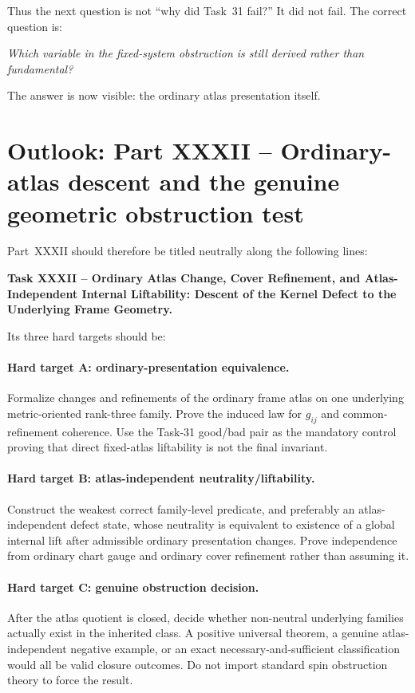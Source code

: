 \documentclass[11pt,a4paper]{article}
\theoremstyle{definition}
\begin{document}
Thus the next question is not ``why did Task~31 fail?''  It did not fail.  The correct question is:
\begin{center}
\emph{Which variable in the fixed-system obstruction is still derived rather than fundamental?}
\end{center}
The answer is now visible: the ordinary atlas presentation itself.

\section{Outlook: Part XXXII -- Ordinary-atlas descent and the genuine geometric obstruction test}\label{sec:outlook}

Part~XXXII should therefore be titled neutrally along the following lines:

\begin{center}
\textbf{Task XXXII -- Ordinary Atlas Change, Cover Refinement, and Atlas-Independent Internal Liftability: Descent of the Kernel Defect to the Underlying Frame Geometry.}
\end{center}

Its three hard targets should be:

\paragraph{Hard target A: ordinary-presentation equivalence.}
Formalize changes and refinements of the ordinary frame atlas on one underlying metric-oriented rank-three family.  Prove the induced law for $g_{ij}$ and common-refinement coherence.  Use the Task-31 good/bad pair as the mandatory control proving that direct fixed-atlas liftability is not the final invariant.

\paragraph{Hard target B: atlas-independent neutrality/liftability.}
Construct the weakest correct family-level predicate, and preferably an atlas-independent defect state, whose neutrality is equivalent to existence of a global internal lift after admissible ordinary presentation changes.  Prove independence from ordinary chart gauge and ordinary cover refinement rather than assuming it.

\paragraph{Hard target C: genuine obstruction decision.}
After the atlas quotient is closed, decide whether non-neutral underlying families actually exist in the inherited class.  A positive universal theorem, a genuine atlas-independent negative example, or an exact necessary-and-sufficient classification would all be valid closure outcomes.  Do not import standard spin obstruction theory to force the result.
\end{document}
